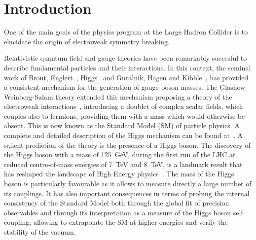 \documentclass[../report.tex]{subfiles}
\begin{document}
\section{Introduction}


One of the main goals of the physics program at the Large Hadron
Collider is to elucidate the origin of  electroweak symmetry
breaking.

Relativistic quantum field and gauge theories have been remarkably
succesful to describe fundamental particles and their
interactions. %
In this context, the seminal work
of Brout, Englert~\cite{Englert:1964et}, Higgs~\cite{Higgs:1964ia,Higgs:1964pj,Higgs:1966ev} and Guralnik, Hagen and Kibble~\cite{Guralnik:1964eu, Kibble:1967sv}, has provided a consistent mechanism for the generation
of gauge boson masses. %
The Glashow-Weinberg-Salam theory
extended this mechanism proposing a theory of the electroweak
interactions~\cite{Glashow:1961tr,Salam:1968,Weinberg:1967tq}, introducing a doublet of complex scalar
fields, which couples also to fermions, providing them with a  mass  which would otherwise be absent. This is now known as the Standard Model (SM) of particle physics. %
A complete and detailed description of the Higgs mechanism
can be found at~\cite{Tanabashi:2018oca}. A salient prediction of the theory is the
presence of a Higgs boson.
The discovery of the Higgs boson with a mass of 125~GeV, during the
first run of the LHC at reduced centre-of-mass energies of 7~TeV and
8~TeV, is a landmark result that has reshaped the landscape of High
Energy physics~\cite{Aad:2012tfa,Chatrchyan:2012xdj}. 
The mass of the Higgs boson is particularly favourable
as it allows to measure directly a large number of its couplings. It
has also important consequences in terms of probing the internal
consistency of the Standard Model both through the global fit of
precision observables and through its interpretation as a measure of
the Higgs boson self coupling, allowing to extrapolate the SM at
higher energies and verify the stability of the vacuum.
\end{document}
